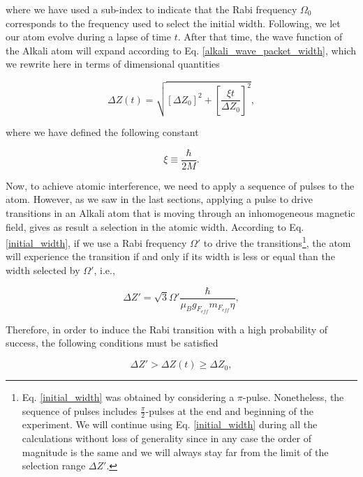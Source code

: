 \documentclass{article}
\begin{document}
where we have used a sub-index to indicate that the Rabi frequency $\Omega_{0}$ corresponds to the frequency used to select the initial width. Following, we let our atom evolve during a lapse of time $t$. After that time, the wave function of the Alkali atom will expand according to Eq. \ref{alkali_wave_packet_width}, which we rewrite here in terms of dimensional quantities

\begin{equation}\label{final_width_dimensional}
\Delta Z (t) = \sqrt{[\Delta Z_{0}]^{2} + \left[\frac{\xi t}{\Delta Z_{0}} \right]^{2}},
\end{equation}

where we have defined the following constant

\begin{equation}\label{xi_definition_for_expansion}
    \xi \equiv \frac{\hbar}{2M}.
\end{equation}

Now, to achieve atomic interference, we need to apply a sequence of pulses to the atom. However, as we saw in the last sections, applying a pulse to drive transitions in an Alkali atom that is moving through an inhomogeneous magnetic field, gives as result a selection in the atomic width. According to Eq. \ref{initial_width}, if we use a Rabi frequency $\Omega'$ to drive the transitions\footnote{Eq. \ref{initial_width} was obtained by considering a $\pi$-pulse. Nonetheless, the sequence of pulses includes $\frac{\pi}{2}$-pulses at the end and beginning of the experiment. We will continue using Eq. \ref{initial_width} during all the calculations without loss of generality since in any case the order of magnitude is the same and we will always stay far from the limit of the selection range $\Delta Z'$.}, the atom will experience the transition if and only if its width is less or equal than the width selected by $\Omega'$, i.e.,

\begin{equation}\label{maximum_width_rabi_frequency}
    \Delta Z' = \sqrt{3} \Omega' \frac{\hbar}{\mu_{B} g_{F_{eff}} m_{F_{eff}} \eta},
\end{equation}

Therefore, in order to induce the Rabi transition with a high probability of success, the following conditions must be satisfied

\begin{equation}\label{condition_transition_width1}
    \Delta Z' > \Delta Z(t) \ge \Delta Z_{0},
\end{equation}
\end{document}
